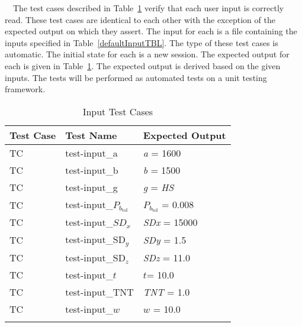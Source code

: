 \documentclass[12pt]{article}
\newcounter{utestnum} %
\begin{document}
~\newline ~\newline \noindent The test cases described in Table~\ref{InputTests} 
verify that each user input is correctly read. These test cases are identical 
to each other with the exception of the expected output on which they assert. 
The input for each is a file containing the inputs specified in 
Table~\ref{defaultInputTBL}. The type of these test cases is automatic. The initial 
state for each is a new session. The expected output for each is given in 
Table~\ref{InputTests}. The expected output is derived based on the given 
inputs. The tests will be performed as automated tests on a unit testing 
framework.



\begin{longtable}{  l  p{4cm}  p{6cm}  }
	\hline
	\textbf{Test Case} & \textbf{Test Name} & \textbf{Expected Output} \\
	\hline
	TC{utestnum}\theutestnum  \label{TC_Length} & 
	test-input\_a &  \textit{a} = 1600\\
	\hline 
	TC{utestnum}\theutestnum  \label{TC_Breadth} & 
	test-input\_b &  \textit{b} = 1500\\ 
	\hline
	TC{utestnum}\theutestnum  \label{TC_GlassType} & 
	test-input\_g &  \textit{g} = \textit{HS}\\ 
	\hline
	TC{utestnum}\theutestnum  \label{TC_PbTol} & 
	test-input\_$P_{b_\text{tol}}$ &  $P_{b_\text{tol}}$ = 0.008\\ 
	\hline
	TC{utestnum}\theutestnum  \label{TC_SDx} & 
	test-input\_${SD}_x$ &  \textit{SDx} = 15000\\ 
	\hline
	TC{utestnum}\theutestnum  \label{TC_Sdy} & 
	test-input\_$\text{SD}_y$ &  \textit{SDy} = 1.5\\
	\hline 
	TC{utestnum}\theutestnum  \label{TC_SDz} & 
	test-input\_$\text{SD}_z$ &  \textit{SDz} = 11.0\\ 
	\hline
	TC{utestnum}\theutestnum  \label{TC_Thickness} & 
	test-input\_$t$ &  $t$= 10.0\\ 
	\hline
	TC{utestnum}\theutestnum  \label{TC_TNT} & 
	test-input\_TNT &  \textit{TNT} = 1.0\\ 
	\hline
	TC{utestnum}\theutestnum  \label{TC_W} & 
	test-input\_$w$ &  $w$ = 10.0\\ 
	\hline
	\caption{Input Test Cases}
	\label{InputTests}
\end{longtable}
\end{document}
